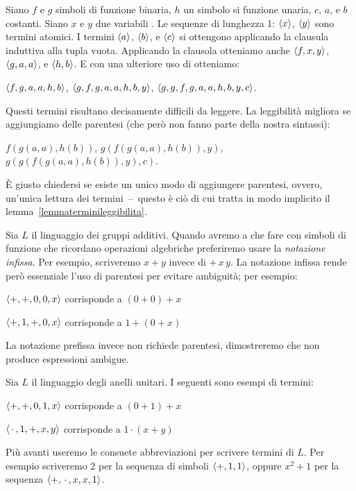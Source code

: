 \begin{example} 
Siano $f$ e $g$ simboli di funzione binaria, $h$ un simbolo si funzione unaria, $c$, $a$, e $b$ costanti. Siano $x$ e $y$ due variabili . Le sequenze di lunghezza 1: $\langle x\rangle$, $\langle y\rangle$ sono termini atomici. I termini $\langle a\rangle$, $\langle b\rangle$, e $\langle c\rangle$ si ottengono applicando la clausula induttiva  alla tupla vuota. Applicando la clausola  otteniamo anche $\langle f, x,y\rangle$, $\langle g,a,a\rangle$, e $\langle h,b\rangle$.  E con una ulteriore uso di  otteniamo: 

\hfil$\langle f,g,a,a,h,b\rangle$, \hfil$\langle g,f,g,a,a,h,b,y\rangle$, \hfil$\langle g,g,f,g,a,a,h,b,y,c\rangle$.

Questi termini risultano decisamente difficili da leggere. La leggibilit\`a migliora se aggiungiamo delle parentesi (che per\`o non fanno parte della nostra sintassi):

\hfil$f(g(a,a),h(b))$, \hfil$g(f(g(a,a),h(b)),y)$, \hfil$g(g(f(g(a,a),h(b)),y),c)$.

\`E giusto chiedersi se esiste un unico modo di aggiungere parentesi, ovvero, un'unica lettura dei termini~--~questo \`e ci\`o di cui tratta in modo implicito il lemma~\ref{lemmaterminileggibilita}.
\end{example}

\begin{example}
Sia $L$ il linguaggio dei gruppi additivi. Quando avremo a che fare con simboli di funzione che ricordano operazioni algebriche preferiremo usare la \emph{notazione infissa}. Per esempio, scriveremo $x+y$ invece di $+\,x\,y$. La notazione infissa rende per\`o essenziale l'uso di parentesi per evitare ambiguit\`a; per esempio:

\hspace*{10ex} $\langle\mathord+,\mathord+,0,0,x\rangle$ corrisponde a $(0+0)+x$

\hspace*{10ex} $\langle\mathord+,1,\mathord+,0,x\rangle$ corrisponde a $1+(0+x)$

La notazione prefissa invece non richiede parentesi, dimostreremo che non produce espressioni ambigue.
\end{example}


\begin{example} 
Sia $L$ il linguaggio degli anelli unitari. I seguenti sono esempi di termini:

\hspace*{10ex}$\langle\mathord+,\mathord+,0,1,x\rangle$ corrisponde a $(0+1)+x$

\hspace*{10ex}$\langle\,\cdot\,,1,\mathord+,x,y\rangle$ corrisponde a $1\cdot (x+y)$

Pi\`u avanti useremo le consuete abbreviazioni per scrivere termini di $L$. Per esempio scriveremo $2$ per la sequenza di simboli $\langle\mathord+,1,1\rangle$, oppure $x^2 +1$ per la sequenza $\langle\mathord+,\,\cdot\,, x,x,1\rangle$.
\end{example}

